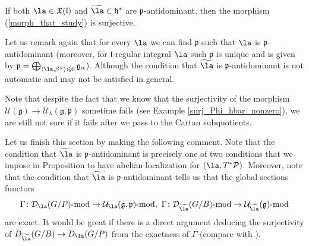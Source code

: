 \documentclass[12pt]{amsart}
\begin{document}
\begin{cor}
If both $\la \in \mathfrak{X}(\mathfrak{l})$ and $\widetilde{\la} \in \mathfrak{h}^*$ are $\mathfrak{p}$-antidominant, then the morphism (\ref{morph_that_study}) is surjective.  
\end{cor}

\begin{rmk}
Let us remark again that for every $\la$ we can find $\mathfrak{p}$ such that $\la$ is $\mathfrak{p}$-antidominant (moreover, for $\mathfrak{l}$-regular integral $\la$ such $\mathfrak{p}$ is unique and is given by $\mathfrak{p}=\bigoplus_{\langle \la,\beta^\vee\rangle \leqslant 0}\mathfrak{g}_\alpha$). Although the condition that $\widetilde{\la}$ is $\mathfrak{p}$-antidominant is not automatic and may not be satisfied in general. 
\end{rmk}




\begin{warning}
Note that despite the fact that we know that the surjectivity of the morphism $\mathcal{U}(\mathfrak{g}) \rightarrow \mathcal{U}_\lambda(\mathfrak{g},\mathfrak{p})$ sometime fails (see Example \ref{surj_Phi_hbar_nonzero}), we are still not sure if it fails after we pass to the Cartan subquotients. 
\end{warning}



Let us finish this section by making the following comment. Note that the condition that $\widetilde{\la}$ is $\mathfrak{p}$-antidominant is precisely one of two conditions that we impose in Proposition to have abelian localization for $(\la,T^*\mathcal{P})$. Moreover, note that the condition that $\widetilde{\la}$ is $\mathfrak{p}$-antidominant tells us that the global sections functors 
\begin{equation*}
\Gamma \colon \mathcal{D}_\la(G/P)\text{-mod} \rightarrow \mathcal{U}_\la(\mathfrak{g},\mathfrak{p})\text{-mod},~
\Gamma \colon \mathcal{D}_{\widetilde{\la}}(G/B)\text{-mod} \rightarrow \mathcal{U}_{\widetilde{\la}}(\mathfrak{g})\text{-mod}
\end{equation*}
are exact. It would be great if there is a direct argument deducing the surjectivity of $D_{\widetilde{\la}}(G/B) \rightarrow D_{\la}(G/P)$ from the exactness of $\Gamma$ (compare with \cite[Proposition 2.14]{HolandPolo}).
\end{document}
